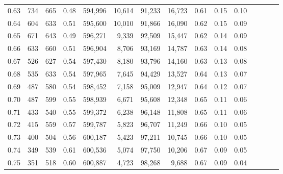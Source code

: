 \begin{tabular}{rrrcrrrrrrrrrrr}
0.63 &     734 &    665 &                                       0.48 &  594,996 &   10,614 &   91,233 &   16,723 &  0.61 &  0.15 &                         0.10 \\
0.64 &     604 &    633 &                                       0.51 &  595,600 &   10,010 &   91,866 &   16,090 &  0.62 &  0.15 &                         0.09 \\
0.65 &     671 &    643 &                                       0.49 &  596,271 &    9,339 &   92,509 &   15,447 &  0.62 &  0.14 &                         0.09 \\
0.66 &     633 &    660 &                                       0.51 &  596,904 &    8,706 &   93,169 &   14,787 &  0.63 &  0.14 &                         0.08 \\
0.67 &     526 &    627 &                                       0.54 &  597,430 &    8,180 &   93,796 &   14,160 &  0.63 &  0.13 &                         0.08 \\
0.68 &     535 &    633 &                                       0.54 &  597,965 &    7,645 &   94,429 &   13,527 &  0.64 &  0.13 &                         0.07 \\
0.69 &     487 &    580 &                                       0.54 &  598,452 &    7,158 &   95,009 &   12,947 &  0.64 &  0.12 &                         0.07 \\
0.70 &     487 &    599 &                                       0.55 &  598,939 &    6,671 &   95,608 &   12,348 &  0.65 &  0.11 &                         0.06 \\
0.71 &     433 &    540 &                                       0.55 &  599,372 &    6,238 &   96,148 &   11,808 &  0.65 &  0.11 &                         0.06 \\
0.72 &     415 &    559 &                                       0.57 &  599,787 &    5,823 &   96,707 &   11,249 &  0.66 &  0.10 &                         0.05 \\
0.73 &     400 &    504 &                                       0.56 &  600,187 &    5,423 &   97,211 &   10,745 &  0.66 &  0.10 &                         0.05 \\
0.74 &     349 &    539 &                                       0.61 &  600,536 &    5,074 &   97,750 &   10,206 &  0.67 &  0.09 &                         0.05 \\
0.75 &     351 &    518 &                                       0.60 &  600,887 &    4,723 &   98,268 &    9,688 &  0.67 &  0.09 &                         0.04 \\

\end{tabular}
